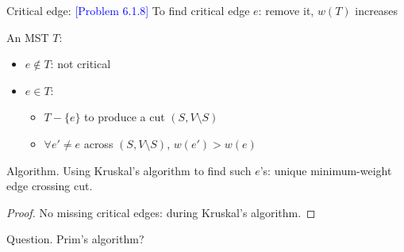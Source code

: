 \documentclass{beamer}
\newcommand{\set}[1]{\{ #1 \}}
\newcommand{\problemno}[1]{\textcolor{blue}{\scriptsize [Problem #1]}}
\begin{document}
\begin{frame}{}
  \begin{block}{Critical edge: \problemno{6.1.8}}
	To find critical edge $e$: remove it, $w(T)$ increases
  \end{block}

  \begin{block}{}
  An MST $T$:
    \begin{itemize}
      \item $e \notin T$: not critical
      \item $e \in T$:
        \begin{itemize}
	      \item $T - \set{e}$ to produce a cut $(S, V \setminus S)$
	      \item $\forall e' \neq e$ across $(S, V \setminus S)$, $w(e') > w(e)$
        \end{itemize}
    \end{itemize}
  \end{block}

  \begin{block}{Algorithm.}
    Using Kruskal's algorithm to find such $e$'s: unique minimum-weight edge
    crossing cut.
  \end{block}

  \begin{proof}
    No missing critical edges: during Kruskal's algorithm.
  \end{proof}

  \begin{block}{Question.}
    Prim's algorithm?
  \end{block}
\end{frame}
\end{document}
